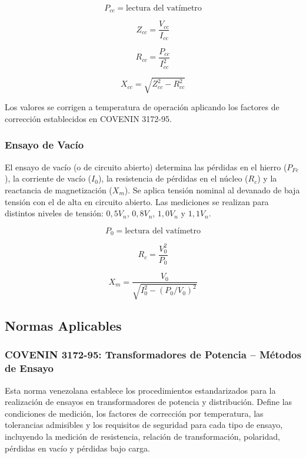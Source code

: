 \begin{equation}
P_{cc}=\text{lectura del vatímetro}
\end{equation}

\begin{equation}
Z_{cc}=\frac{V_{cc}}{I_{cc}}
\end{equation}

\begin{equation}
R_{cc}=\frac{P_{cc}}{I_{cc}^{2}}
\end{equation}

\begin{equation}
X_{cc}=\sqrt{Z_{cc}^{2}-R_{cc}^{2}}
\end{equation}

Los valores se corrigen a temperatura de operación aplicando los factores de corrección establecidos en COVENIN 3172-95.

\subsubsection{Ensayo de Vacío}

El ensayo de vacío (o de circuito abierto) determina las pérdidas en el hierro ($P_{Fe}$), la corriente de vacío ($I_0$), la resistencia de pérdidas en el núcleo ($R_c$) y la reactancia de magnetización ($X_m$). Se aplica tensión nominal al devanado de baja tensión con el de alta en circuito abierto. Las mediciones se realizan para distintos niveles de tensión: $0,5V_n$, $0,8V_n$, $1,0V_n$ y $1,1V_n$.

\begin{equation}
P_0=\text{lectura del vatímetro}
\end{equation}

\begin{equation}
R_c=\frac{V_0^2}{P_0}
\end{equation}

\begin{equation}
X_m=\frac{V_0}{\sqrt{I_0^2-(P_0/V_0)^2}}
\end{equation}

\subsection{Normas Aplicables}

\subsubsection{COVENIN 3172-95: Transformadores de Potencia -- Métodos de Ensayo}

Esta norma venezolana establece los procedimientos estandarizados para la realización de ensayos en transformadores de potencia y distribución. Define las condiciones de medición, los factores de corrección por temperatura, las tolerancias admisibles y los requisitos de seguridad para cada tipo de ensayo, incluyendo la medición de resistencia, relación de transformación, polaridad, pérdidas en vacío y pérdidas bajo carga.
